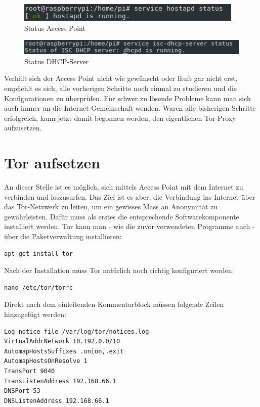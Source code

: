 \begin{figure}[h]
\centering
\includegraphics[scale=0.7]{images/hostapd_status}
\caption{Status Access Point}
\end{figure}

\begin{figure}[h]
\centering
\includegraphics[scale=0.7]{images/dhcp_status}
\caption{Status DHCP-Server}
\end{figure}

Verhält sich der Access Point nicht wie gewünscht oder läuft gar nicht erst, empfiehlt es sich, alle vorherigen Schritte noch einmal zu studieren und die Konfigurationen zu überprüfen. Für schwer zu lösende Probleme kann man sich auch immer an die Internet-Gemeinschaft wenden. Waren alle bisherigen Schritte erfolgreich, kann jetzt damit begonnen werden, den eigentlichen Tor-Proxy aufzusetzen.

\section{Tor aufsetzen}
An dieser Stelle ist es möglich, sich mittels Access Point mit dem Internet zu verbinden und loszusurfen. Das Ziel ist es aber, die Verbindung ins Internet über das Tor-Netzwerk zu leiten, um ein gewisses Mass an Anonymität zu gewährleisten. Dafür muss als erstes die entsprechende Softwarekomponente installiert werden. Tor kann man - wie die zuvor verwendeten Programme auch - über die Paketverwaltung installieren:

\begin{lstlisting}
apt-get install tor
\end{lstlisting}

Nach der Installation muss Tor natürlich noch richtig konfiguriert werden: 

\begin{lstlisting}
nano /etc/tor/torrc
\end{lstlisting} 

Direkt nach dem einleitenden Kommentarblock müssen folgende Zeilen hinzugefügt werden:

\begin{lstlisting}
Log notice file /var/log/tor/notices.log
VirtualAddrNetwork 10.192.0.0/10
AutomapHostsSuffixes .onion,.exit
AutomapHostsOnResolve 1
TransPort 9040
TransListenAddress 192.168.66.1
DNSPort 53
DNSListenAddress 192.168.66.1
\end{lstlisting}

